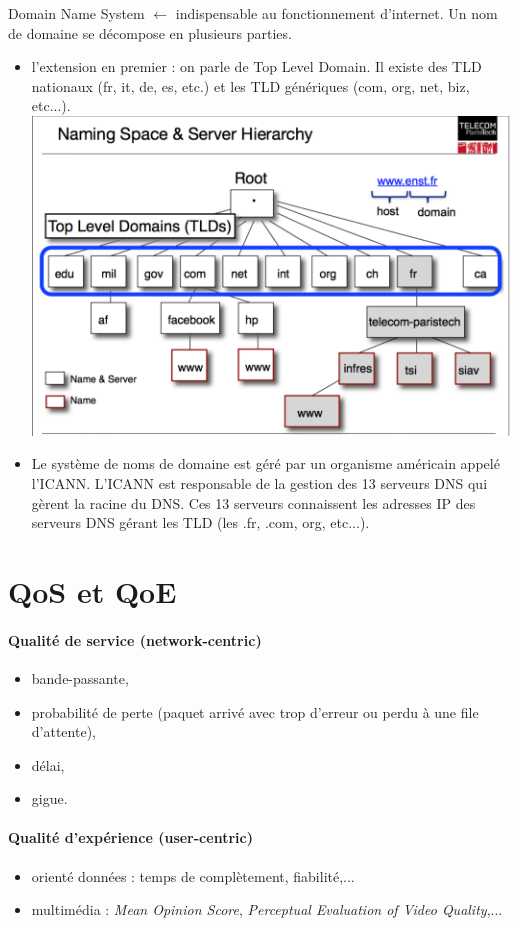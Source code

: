\documentclass[a4paper,9pt, twocolumn]{article}
\begin{document}
	Domain Name System $\leftarrow$ indispensable au fonctionnement d'internet.
	Un nom de domaine se décompose en plusieurs parties.
	\begin{itemize}
		\item l'extension en premier : on parle de Top Level Domain.
			Il existe des TLD nationaux (fr, it, de, es, etc.) et les TLD génériques (com, org, net, biz, etc...).
			\includegraphics[scale=0.45]{dns.png}
		\item Le système de noms de domaine est géré par un organisme américain appelé l'ICANN.
			L'ICANN est responsable de la gestion des 13 serveurs DNS qui gèrent la racine du DNS.
			Ces 13 serveurs connaissent les adresses IP des serveurs DNS gérant les TLD (les .fr, .com, org, etc...).
	\end{itemize}
	
\section*{QoS et QoE}

	\paragraph{Qualité de service (network-centric)}
		\begin{itemize}
		\item bande-passante,
		\item probabilité de perte (paquet arrivé avec trop d'erreur ou perdu à une file d'attente),
		\item délai,
		\item gigue.
		\end{itemize}
		
	\paragraph{Qualité d'expérience (user-centric)}
		\begin{itemize}
		\item orienté données : temps de complètement, fiabilité,...
		\item multimédia : \textit{Mean Opinion Score}, \textit{Perceptual Evaluation of Video Quality},...
		\end{itemize}
\end{document}
